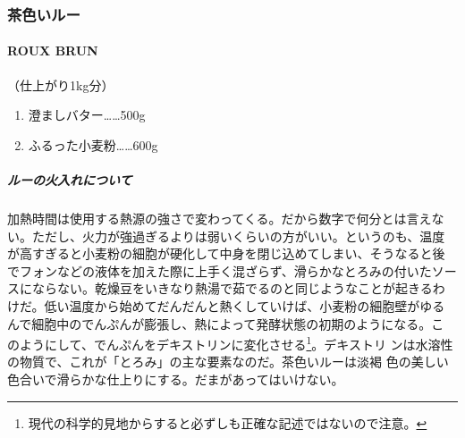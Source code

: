 \maeaki
\begin{recette}
\hypertarget{ux8336ux8272ux3044ux30ebux30fc}{%
\subsubsection{茶色いルー}\label{ux8336ux8272ux3044ux30ebux30fc}}

\hypertarget{roux-brun}{%
\paragraph{ROUX BRUN}\label{roux-brun}}

 

（仕上がり1kg分）

\begin{enumerate}
\def\labelenumi{\arabic{enumi}.}
\tightlist
\item
  澄ましバター\ldots{}\ldots{}500g
\item
  ふるった小麦粉\ldots{}\ldots{}600g
\end{enumerate}

\maeaki

\hypertarget{ux30ebux30fcux306eux706bux5165ux308cux306bux3064ux3044ux3066}{%
\subparagraph{ルーの火入れについて}\label{ux30ebux30fcux306eux706bux5165ux308cux306bux3064ux3044ux3066}}


加熱時間は使用する熱源の強さで変わってくる。だから数字で何分とは言えな
い。ただし、火力が強過ぎるよりは弱いくらいの方がいい。というのも、温度
が高すぎると小麦粉の細胞が硬化して中身を閉じ込めてしまい、そうなると後
でフォンなどの液体を加えた際に上手く混ざらず、滑らかなとろみの付いたソー
スにならない。乾燥豆をいきなり熱湯で茹でるのと同じようなことが起きるわ
けだ。低い温度から始めてだんだんと熱くしていけば、小麦粉の細胞壁がゆる
んで細胞中のでんぷんが膨張し、熱によって発酵状態の初期のようになる。こ
のようにして、でんぷんをデキストリンに変化させる\footnote{現代の科学的見地からすると必ずしも正確な記述ではないので注意。}。デキストリ
ンは水溶性の物質で、これが「とろみ」の主な要素なのだ。茶色いルーは淡褐
色の美しい色合いで滑らかな仕上りにする。だまがあってはいけない。


\end{recette}
